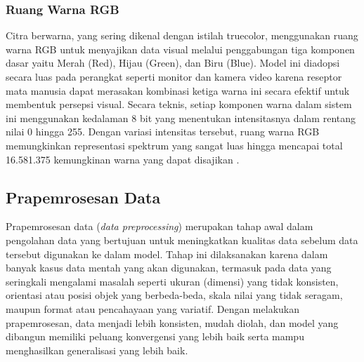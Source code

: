 \subsubsection{Ruang Warna RGB} \label{II.Ruang-Warna-RGB}
Citra berwarna, yang sering dikenal dengan istilah truecolor, menggunakan ruang warna RGB untuk menyajikan data visual melalui penggabungan tiga komponen dasar yaitu Merah (Red), Hijau (Green), dan Biru (Blue). Model ini diadopsi secara luas pada perangkat seperti monitor dan kamera video karena reseptor mata manusia dapat merasakan kombinasi ketiga warna ini secara efektif untuk membentuk persepsi visual. Secara teknis, setiap komponen warna dalam sistem ini menggunakan kedalaman 8 bit yang menentukan intensitasnya dalam rentang nilai 0 hingga 255. Dengan variasi intensitas tersebut, ruang warna RGB memungkinkan representasi spektrum yang sangat luas hingga mencapai total 16.581.375 kemungkinan warna yang dapat disajikan \cite{bookCitra}. \par

\subsection{Prapemrosesan Data} \label{II.TeoriPrapemrosesan}
Prapemrosesan data (\textit{data preprocessing}) merupakan tahap awal dalam pengolahan data yang bertujuan untuk meningkatkan kualitas data sebelum data tersebut digunakan ke dalam model. Tahap ini dilaksanakan karena dalam banyak kasus data mentah yang akan digunakan, termasuk pada data yang seringkali mengalami masalah seperti ukuran (dimensi) yang tidak konsisten, orientasi atau posisi objek yang berbeda-beda, skala nilai yang tidak seragam, maupun format atau pencahayaan yang variatif. Dengan melakukan prapemrosesan, data menjadi lebih konsisten, mudah diolah, dan model yang dibangun memiliki peluang konvergensi yang lebih baik serta mampu menghasilkan generalisasi yang lebih baik. \par

